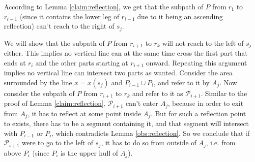 \documentclass[pdflatex,sn-mathphys-num]{sn-jnl}
\theoremstyle{thmstyleone}
\begin{document}
	According to Lemma \ref{claim:reflection}, we get that the subpath of $P$ from $r_{1}$ to $r_{i - 1}$ (since it contains the lower leg of $r_{i - 1}$ due to it being an ascending reflection) can't reach to the right of $s_{j}$.      
	
	We will show that the subpath of $P$ from $r_{i + 1}$ to $r_k$ will not reach to the left of $s_j$ either. This implies no vertical line can at the same time cross the first part that ends at $r_i$ and the other parts starting at $r_{i+1}$ onward. Repeating this argument implies no vertical line can intersect two parts as wanted.
        Consider the area surrounded by the line $x = x(s_j)$ and $P_{i - 1}\cup P_{i}$, and refer to it by $A_{j}$. 
        Now consider the subpath of $P$ from $r_{i + 1}$ to $r_{k}$ and refer to it as $\mathcal P_{i + 1}$. Similar to the proof of Lemma \ref{claim:reflection}, $\mathcal P_{i+1}$ can't enter $A_j$, because in order to exit from $A_j$, it has to reflect at some point inside $A_j$. 
        But for such a reflection point to exists, there has to be a segment containing it,
        and that segment will intersect with $P_{i-1}$ or $P_{i}$, 
        which contradicts Lemma \ref{obs:reflection}. 
        So we conclude that if $\mathcal P_{i + 1}$ were to go to the left of $s_{j}$, it has to do so from outside of $A_{j}$, i.e. from above $P_i$ (since $P_i$ is the upper hull of $A_j$).
\end{document}
